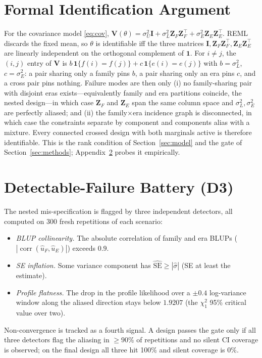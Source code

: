 \documentclass{ieeeaccess}
\theoremstyle{definition}
\theoremstyle{plain}
\begin{document}
\section{Formal Identification Argument}
\label{app:identification}
For the covariance model \eqref{eq:cov},
$\mathbf{V}(\theta)=\sigma^{2}_{U}\mathbf{I}+\sigma^{2}_{L}\mathbf{Z}_{F}\mathbf{Z}_{F}^{\top}
+\sigma^{2}_{E}\mathbf{Z}_{E}\mathbf{Z}_{E}^{\top}$. REML discards the fixed mean,
so $\theta$ is identifiable iff the three matrices
$\mathbf{I},\mathbf{Z}_{F}\mathbf{Z}_{F}^{\top},\mathbf{Z}_{E}\mathbf{Z}_{E}^{\top}$
are linearly independent on the orthogonal complement of $\mathbf{1}$. For
$i\neq j$, the $(i,j)$ entry of $\mathbf{V}$ is
$b\,\mathbf{1}\{f(i)=f(j)\}+c\,\mathbf{1}\{e(i)=e(j)\}$ with
$b=\sigma^{2}_{L}$, $c=\sigma^{2}_{E}$: a pair sharing only a family pins $b$, a
pair sharing only an era pins $c$, and a cross pair pins nothing. Failure modes
are then only (i) no family-sharing pair with disjoint eras exists---equivalently
family and era partitions coincide, the nested design---in which case
$\mathbf{Z}_{F}$ and $\mathbf{Z}_{E}$ span the same column space and
$\sigma^{2}_{L},\sigma^{2}_{E}$ are perfectly aliased; and (ii) the
family$\times$era incidence graph is disconnected, in which case the constraints
separate by component and components alias with a mixture. Every connected
crossed design with both marginals active is therefore identifiable. This is the
rank condition of Section~\ref{sec:model} and the gate of
Section~\ref{sec:methods}; Appendix~\ref{app:d3} probes it empirically.

\section{Detectable-Failure Battery (D3)}
\label{app:d3}
The nested mis-specification is flagged by three independent detectors, all
computed on 300 fresh repetitions of each scenario:
\begin{itemize}
\item \emph{BLUP collinearity.} The absolute correlation of family and era BLUPs
  ($|\operatorname{corr}(\hat{u}_{F},\hat{u}_{E})|$) exceeds $0.9$.
\item \emph{SE inflation.} Some variance component has
  $\widehat{\mathrm{SE}} \ge |\hat{\sigma}|$ (SE at least the estimate).
\item \emph{Profile flatness.} The drop in the profile likelihood over a
  $\pm0.4$ log-variance window along the aliased direction stays below
  $1.9207$ (the $\chi^{2}_{1}$ 95\% critical value over two).
\end{itemize}
Non-convergence is tracked as a fourth signal. A design passes the gate only if
all three detectors flag the aliasing in $\ge90\%$ of repetitions and no silent
CI coverage is observed; on the final design all three hit 100\% and silent
coverage is $0\%$.
\end{document}
